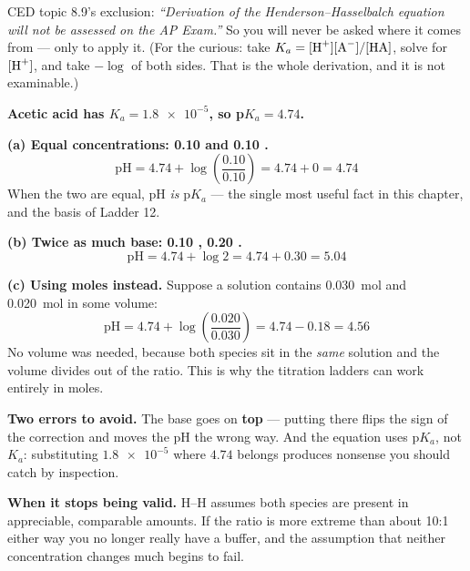 \documentclass{apchem-worksheet}
\begin{document}
\begin{apcnote}
CED topic 8.9's exclusion: \emph{``Derivation of the
Henderson--Hasselbalch equation will not be assessed on the AP
Exam.''} So you will never be asked where it comes from --- only to
apply it. (For the curious: take $K_{a} =
[\ce{H+}][\ce{A-}]/[\ce{HA}]$, solve for $[\ce{H+}]$, and take
$-\log$ of both sides. That is the whole derivation, and it is not
examinable.)
\end{apcnote}

\begin{workedexample}
\textbf{Acetic acid has $K_{a} = \num{1.8e-5}$, so
p$K_{a} = 4.74$.}

\textbf{(a) Equal concentrations: \SI{0.10}{\Molar}  and
\SI{0.10}{\Molar} .}
\[ \text{pH} = 4.74 + \log\!\left(\frac{0.10}{0.10}\right)
   = 4.74 + 0 = \mathbf{4.74} \]
When the two are equal, pH \emph{is} p$K_{a}$ --- the single most
useful fact in this chapter, and the basis of Ladder 12.

\textbf{(b) Twice as much base: \SI{0.10}{\Molar} ,
\SI{0.20}{\Molar} .}
\[ \text{pH} = 4.74 + \log 2 = 4.74 + 0.30 = \mathbf{5.04} \]

\textbf{(c) Using moles instead.} Suppose a solution contains
\SI{0.030}{\mole}  and \SI{0.020}{\mole}  in some volume:
\[ \text{pH} = 4.74 + \log\!\left(\frac{0.020}{0.030}\right)
   = 4.74 - 0.18 = \mathbf{4.56} \]
No volume was needed, because both species sit in the \emph{same}
solution and the volume divides out of the ratio. This is why the
titration ladders can work entirely in moles.

\textbf{Two errors to avoid.} The base goes on \textbf{top} --- putting
 there flips the sign of the correction and moves the pH the
wrong way. And the equation uses p$K_{a}$, not $K_{a}$: substituting
$\num{1.8e-5}$ where $4.74$ belongs produces nonsense you should catch
by inspection.

\textbf{When it stops being valid.} H--H assumes both species are
present in appreciable, comparable amounts. If the ratio is more
extreme than about 10:1 either way you no longer really have a buffer,
and the assumption that neither concentration changes much begins to
fail.
\end{workedexample}
\end{document}

